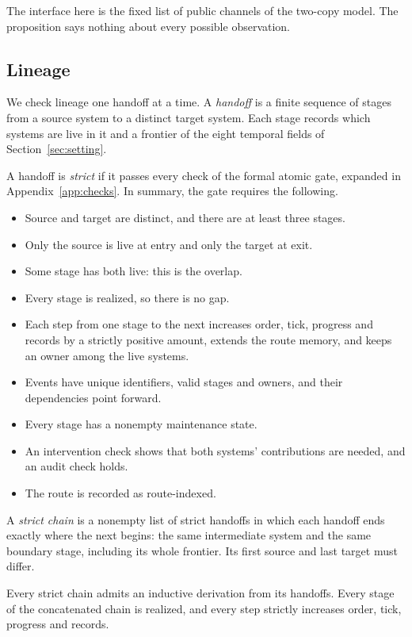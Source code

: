 The interface here is the fixed list of public channels of the two-copy model.
The proposition says nothing about every possible observation.

\subsection{Lineage}
\label{sec:lineage}

We check lineage one handoff at a time. A \emph{handoff} is a finite
sequence of stages from a source system to a distinct target system. Each
stage records which systems are live in it and a frontier of the eight
temporal fields of Section~\ref{sec:setting}.

\begin{definition}
\label{def:handoff}
A handoff is \emph{strict} if it passes every check of the formal atomic
gate, expanded in Appendix~\ref{app:checks}. In summary, the gate
requires the following.
\begin{itemize}
\item Source and target are distinct, and there are at least three stages.
\item Only the source is live at entry and only the target at exit.
\item Some stage has both live: this is the overlap.
\item Every stage is realized, so there is no gap.
\item Each step from one stage to the next increases order, tick, progress
and records by a strictly positive amount, extends the route memory, and keeps
an owner among the live systems.
\item Events have unique identifiers, valid stages and owners, and their
dependencies point forward.
\item Every stage has a nonempty maintenance state.
\item An intervention check shows that both systems' contributions are needed,
and an audit check holds.
\item The route is recorded as route-indexed.
\end{itemize}
A \emph{strict chain} is a nonempty list of strict handoffs in which each
handoff ends exactly where the next begins: the same intermediate system and
the same boundary stage, including its whole frontier. Its first source and
last target must differ.
\end{definition}

\begin{proposition}
\label{prop:chain}
Every strict chain admits an inductive derivation from its handoffs. Every
stage of the concatenated chain is realized, and every step strictly increases
order, tick, progress and records.
\end{proposition}

